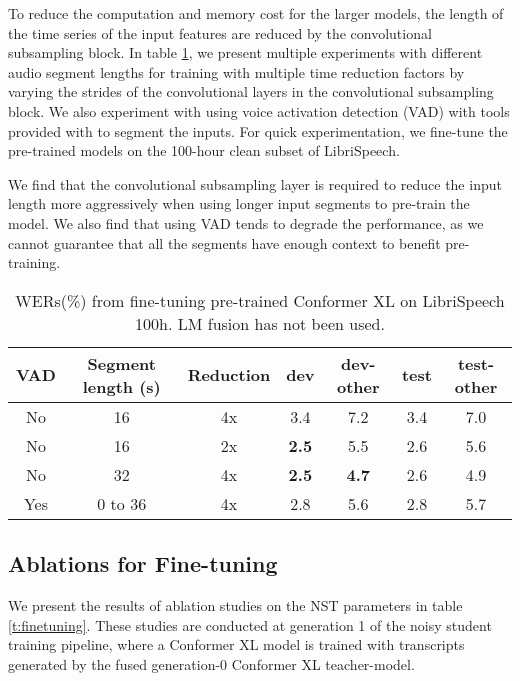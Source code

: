 \documentclass[dvipsnames]{article}
\begin{document}
To reduce the computation and memory cost for the larger models, the length of the time series of the input features are reduced by the convolutional subsampling block. In table \ref{t:pretraining}, we present multiple experiments with different audio segment lengths for training with multiple time reduction factors by varying the strides of the convolutional layers in the convolutional subsampling block. We also experiment with using voice activation detection (VAD) with tools provided with \cite{librilight} to segment the inputs. For quick experimentation, we fine-tune the pre-trained models on the 100-hour clean subset of LibriSpeech.

We find that the convolutional subsampling layer is required to reduce the input length more aggressively when using longer input segments to pre-train the model. We also find that using VAD tends to degrade the performance, as we cannot guarantee that all the segments have enough context to benefit pre-training.

\begin{table}[h!]
  \vskip -0.05in
  \caption{WERs(\%) from fine-tuning pre-trained Conformer XL on LibriSpeech 100h. LM fusion has not been used.}
  \vskip 0.1in
  \label{t:pretraining}
  \centering
  \resizebox{0.8\columnwidth}{!}
  {\begin{tabular}{ccccccc}
    \toprule
    VAD & Segment length (s) & Reduction & \bfseries dev & \bfseries dev-other & \bfseries test & \bfseries test-other \\
    \midrule
    No & 16 & 4x &  3.4 & 7.2 & 3.4 & 7.0 \\
    No & 16 & 2x & \bfseries 2.5  & 5.5 & 2.6 & 5.6 \\
    No & 32 & 4x & \bfseries 2.5  & \bfseries 4.7 & 2.6 & 4.9 \\
    Yes & 0 to 36 & 4x & 2.8 & 5.6 & 2.8 & 5.7 \\
    \bottomrule
  \end{tabular}
  }
\end{table}



\subsection{Ablations for Fine-tuning}

We present the results of ablation studies on the NST parameters in table \ref{t:finetuning}. These studies are conducted at generation 1 of the noisy student training pipeline, where a Conformer XL model is trained with transcripts generated by the fused generation-0 Conformer XL teacher-model.
\end{document}

